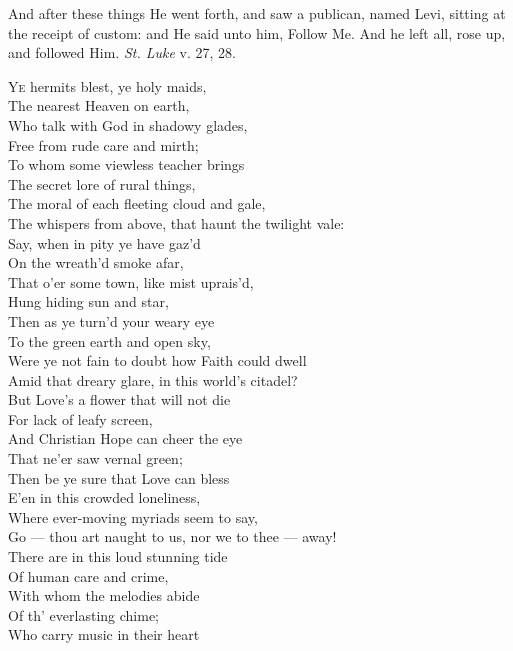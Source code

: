 
And after these things He went forth, and saw a publican, named Levi, sitting at the receipt of custom: and He said unto him, Follow Me. And he left all, rose up, and followed Him. \emph{St. Luke} v. 27, 28.

\textsc{Ye} hermits blest, ye holy maids, \\
 The nearest Heaven on earth, \\
 Who talk with God in shadowy glades, \\
 Free from rude care and mirth; \\
 To whom some viewless teacher brings \\
 The secret lore of rural things, \\
 The moral of each fleeting cloud and gale, \\
 The whispers from above, that haunt the twilight vale: \\
  Say, when in pity ye have gaz’d \\
 On the wreath’d smoke afar, \\
 That o’er some town, like mist uprais’d, \\
 Hung hiding sun and star, \\
 Then as ye turn’d your weary eye \\
 To the green earth and open sky, \\
 Were ye not fain to doubt how Faith could dwell \\
 Amid that dreary glare, in this world’s citadel? \\
  But Love’s a flower that will not die \\
 For lack of leafy screen, \\
 And Christian Hope can cheer the eye \\
 That ne’er saw vernal green; \\
 Then be ye sure that Love can bless \\
 E’en in this crowded loneliness, \\
 Where ever-moving myriads seem to say, \\
 Go — thou art naught to us, nor we to thee — away! \\
  There are in this loud stunning tide \\
 Of human care and crime, \\
 With whom the melodies abide \\
 Of th’ everlasting chime; \\
 Who carry music in their heart \\

